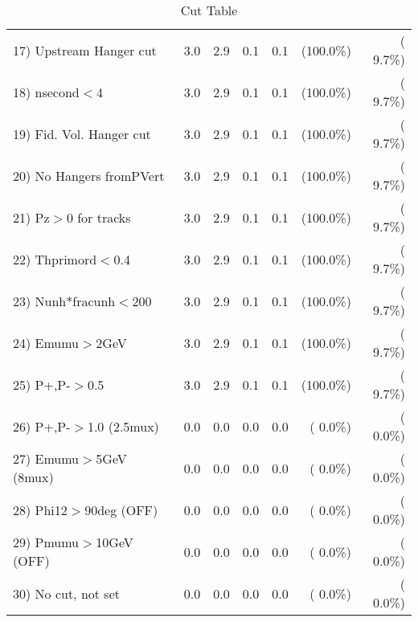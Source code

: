 \begin{table}[h!]
\begin{tabular}{||l||r|r|r|r|r|r||}
 17) Upstream Hanger cut  &          3.0 &          2.9 &          0.1 &          0.1 & (100.0\%) & (  9.7\%) \\
 18) nsecond$<$4          &          3.0 &          2.9 &          0.1 &          0.1 & (100.0\%) & (  9.7\%) \\
 19) Fid. Vol. Hanger cut &          3.0 &          2.9 &          0.1 &          0.1 & (100.0\%) & (  9.7\%) \\
 20) No Hangers fromPVert &          3.0 &          2.9 &          0.1 &          0.1 & (100.0\%) & (  9.7\%) \\
 21) Pz$>$0 for tracks    &          3.0 &          2.9 &          0.1 &          0.1 & (100.0\%) & (  9.7\%) \\
 22) Thprimord$<$0.4      &          3.0 &          2.9 &          0.1 &          0.1 & (100.0\%) & (  9.7\%) \\
 23) Nunh*fracunh$<$200   &          3.0 &          2.9 &          0.1 &          0.1 & (100.0\%) & (  9.7\%) \\
 24) Emumu$>$2GeV         &          3.0 &          2.9 &          0.1 &          0.1 & (100.0\%) & (  9.7\%) \\
 25) P+,P-$>$0.5          &          3.0 &          2.9 &          0.1 &          0.1 & (100.0\%) & (  9.7\%) \\
 26) P+,P-$>$1.0 (2.5mux) &          0.0 &          0.0 &          0.0 &          0.0 & (  0.0\%) & (  0.0\%) \\
 27) Emumu$>$5GeV  (8mux) &          0.0 &          0.0 &          0.0 &          0.0 & (  0.0\%) & (  0.0\%) \\
 28) Phi12$>$90deg  (OFF) &          0.0 &          0.0 &          0.0 &          0.0 & (  0.0\%) & (  0.0\%) \\
 29) Pmumu$>$10GeV  (OFF) &          0.0 &          0.0 &          0.0 &          0.0 & (  0.0\%) & (  0.0\%) \\
 30) No cut, not set      &          0.0 &          0.0 &          0.0 &          0.0 & (  0.0\%) & (  0.0\%) \\
 \hline
 \hline
 \end{tabular}
 \caption{Cut Table           }
 \label{tab-cutheavy_neutrino_2.000}
 \end{table}
